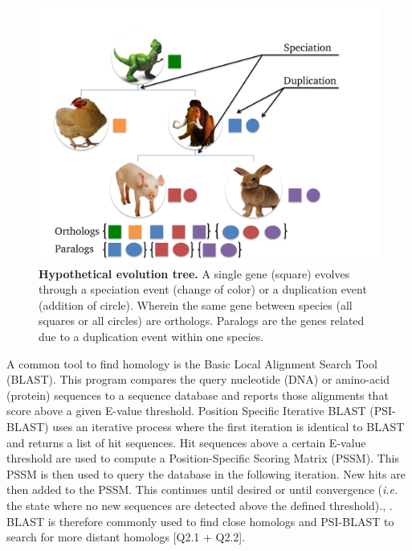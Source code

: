 \documentclass{article}
\begin{document}
\begin{figure}[!ht]
\includegraphics[width=\linewidth]{homology}
\caption{\textbf{Hypothetical evolution tree.} A single gene (square) evolves through a speciation event (change of color) or a duplication event (addition of circle). Wherein the same gene between species (all squares or all circles) are orthologs. Paralogs are the genes related due to a duplication event within one species.}
\label{fig:homology}
\end{figure}

\newpage
A common tool to find homology is the Basic Local Alignment Search Tool (BLAST). This program compares the query nucleotide (DNA) or amino-acid (protein) sequences to a sequence database and reports those alignments that score above a given E-value threshold. Position Specific Iterative BLAST (PSI-BLAST) uses an iterative process where the first iteration is identical to BLAST and returns a list of hit sequences. Hit sequences above a certain E-value threshold are used to compute a Position-Specific Scoring Matrix (PSSM). This PSSM is then used to query the database in the following iteration. New hits are then added to the PSSM. This continues until desired or until convergence (\textit{i.e.} the state where no new sequences are detected above the defined threshold).\citep{bhagwat_psi-blast_2007}, \citep{bergman_comparative_2007}. BLAST is therefore commonly used to find close homologs and PSI-BLAST to search for more distant homologs [Q2.1 + Q2.2].
\end{document}
